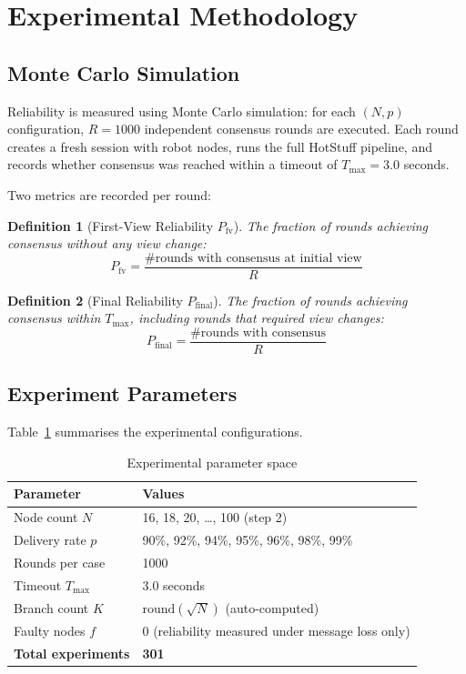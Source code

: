 \documentclass[
12pt,
oneside,
singlespacing,
parskip,
]{article}
\newtheorem{definition}{Definition}[section]
\begin{document}
\section{Experimental Methodology}
\label{sec:methodology}

\subsection{Monte Carlo Simulation}

Reliability is measured using Monte Carlo simulation: for each $(N, p)$ configuration, $R = 1000$ independent consensus rounds are executed. Each round creates a fresh session with robot nodes, runs the full HotStuff pipeline, and records whether consensus was reached within a timeout of $T_\mathrm{max} = 3.0$ seconds.

Two metrics are recorded per round:

\begin{definition}[First-View Reliability $P_\mathrm{fv}$]
The fraction of rounds achieving consensus without any view change:
\[
  P_\mathrm{fv} = \frac{\#\text{rounds with consensus at initial view}}{R}
\]
\end{definition}

\begin{definition}[Final Reliability $P_\mathrm{final}$]
The fraction of rounds achieving consensus within $T_\mathrm{max}$, including rounds that required view changes:
\[
  P_\mathrm{final} = \frac{\#\text{rounds with consensus}}{R}
\]
\end{definition}

\subsection{Experiment Parameters}

Table~\ref{tab:experiments} summarises the experimental configurations.

\begin{table}[H]
\centering
\caption{Experimental parameter space}
\label{tab:experiments}
\begin{tabular}{ll}
\toprule
\textbf{Parameter} & \textbf{Values} \\
\midrule
Node count $N$ & 16, 18, 20, \ldots, 100 (step 2) \\
Delivery rate $p$ & 90\%, 92\%, 94\%, 95\%, 96\%, 98\%, 99\% \\
Rounds per case & 1000 \\
Timeout $T_\mathrm{max}$ & 3.0 seconds \\
Branch count $K$ & $\mathrm{round}(\sqrt{N})$ (auto-computed) \\
Faulty nodes $f$ & 0 (reliability measured under message loss only) \\
\midrule
\textbf{Total experiments} & \textbf{301} \\
\bottomrule
\end{tabular}
\end{table}
\end{document}
